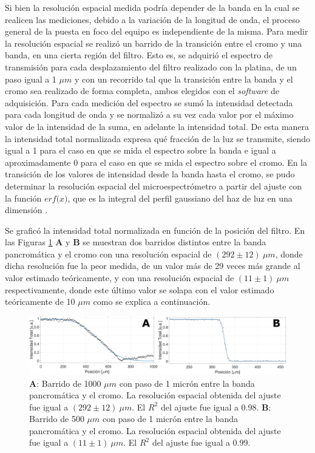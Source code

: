 Si bien la resolución espacial medida podría depender de la banda en la cual se realicen las mediciones, debido a la variación de la longitud de onda, el proceso general de la puesta en foco del equipo es independiente de la misma. Para medir la resolución espacial se realizó un barrido de la transición entre el cromo y una banda, en una cierta región del filtro. Esto es, se adquirió el espectro de transmisión para cada desplazamiento del filtro realizado con la platina, de un paso igual a 1 $\mu m$ y con un recorrido tal que la transición entre la banda y el cromo sea realizado de forma completa, ambos elegidos con el \textit{software} de adquisición. Para cada medición del espectro se sumó la intensidad detectada para cada longitud de onda y se normalizó a su vez cada valor por el máximo valor de la intensidad de la suma, en adelante la intensidad total. De esta manera la intensidad total normalizada expresa qué fracción de la luz se transmite, siendo igual a 1 para el caso en que se mida el espectro sobre la banda e igual a aproximadamente 0 para el caso en que se mida el espectro sobre el cromo. En la transición de los valores de intensidad desde la banda hasta el cromo, se pudo determinar la resolución espacial del microespectrómetro a partir del ajuste con la función $\textit{erf(x)}$, que es la integral del perfil gaussiano del haz de luz en una dimensión \cite{LASCH}. 

Se graficó la intensidad total normalizada en función de la posición del filtro. En las Figuras \ref{fig:bgresol} \textbf{A} y \textbf{B} se muestran dos barridos distintos entre la banda pancromática y el cromo con una resolución espacial de $(292 \pm 12)~ \mu m$, donde dicha resolución fue la peor medida, de un valor más de 29 veces más grande al valor estimado teóricamente, y con una resolución espacial de $(11 \pm 1)~ \mu m$ respectivamente, donde este último valor se solapa con el valor estimado teóricamente de 10 $\mu m$ como se explica a continuación.

\begin{figure}[H]
\centering
\includegraphics[width=1.0\textwidth]{Figs/microespectrometro/resreso.png}
\caption{\textbf{A}: Barrido de 1000 $\mu m$ con paso de 1 micrón entre la banda pancromática y el cromo. La resolución espacial obtenida del ajuste fue igual a $(292 \pm 12)~ \mu m$. El $R^{2}$ del ajuste fue igual a 0.98. \textbf{B}: Barrido de 500 $\mu m$ con paso de 1 micrón entre la banda pancromática y el cromo. La resolución espacial obtenida del ajuste fue igual a $(11 \pm 1)~ \mu m$. El $R^{2}$ del ajuste fue igual a 0.99.}
\label{fig:bgresol}
\end{figure}

